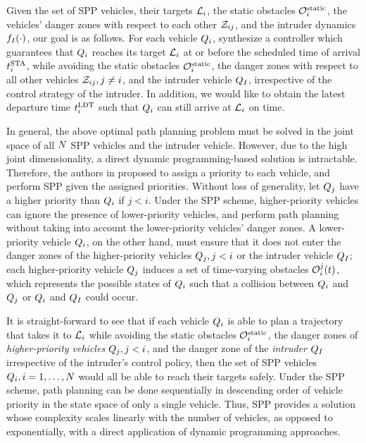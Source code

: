 Given the set of SPP vehicles, their targets $\mathcal{L}_i$, the static obstacles $\mathcal{O}^\text{static}_i$, the vehicles' danger zones with respect to each other $\mathcal{Z}_{ij}$, and the intruder dynamics $f_I(\cdot)$, our goal is as follows. For each vehicle $Q_i$, synthesize a controller which guarantees that $Q_i$ reaches its target $\mathcal{L}_i$ at or before the scheduled time of arrival $t^\text{STA}_i$, while avoiding the static obstacles $\mathcal{O}^\text{static}_i$, the danger zones with respect to all other vehicles $\mathcal{Z}_{ij}, j\neq i$, and the intruder vehicle $Q_{I}$, irrespective of the control strategy of the intruder. In addition, we would like to obtain the latest departure time $t^\text{LDT}_i$ such that $Q_i$ can still arrive at $\mathcal{L}_i$ on time.

In general, the above optimal path planning problem must be solved in the joint space of all $N$ SPP vehicles and the intruder vehicle. However, due to the high joint dimensionality, a direct dynamic programming-based solution is intractable. Therefore, the authors in \cite{Chen15c} proposed to assign a priority to each vehicle, and perform SPP given the assigned priorities. Without loss of generality, let $Q_j$ have a higher priority than $Q_i$ if $j<i$. Under the SPP scheme, higher-priority vehicles can ignore the presence of lower-priority vehicles, and perform path planning without taking into account the lower-priority vehicles' danger zones. A lower-priority vehicle $Q_i$, on the other hand, must ensure that it does not enter the danger zones of the higher-priority vehicles $Q_j, j<i$ or the intruder vehicle $Q_{I}$; each higher-priority vehicle $Q_j$ induces a set of time-varying obstacles $\mathcal{O}_i^j(t)$, which represents the possible states of $Q_i$ such that a collision between $Q_i$ and $Q_j$ or $Q_i$ and $Q_{I}$ could occur.

It is straight-forward to see that if each vehicle $Q_i$ is able to plan a trajectory that takes it to $\mathcal{L}_i$ while avoiding the static obstacles $\mathcal{O}^\text{static}_i$, the danger zones of \textit{higher-priority vehicles} $Q_j, j<i$, and the danger zone of the \textit{intruder} $Q_{I}$ irrespective of the intruder's control policy, then the set of SPP vehicles $Q_i, i=1,\ldots,N$ would all be able to reach their targets safely. Under the SPP scheme, path planning can be done sequentially in descending order of vehicle priority in the state space of only a single vehicle. Thus, SPP provides a solution whose complexity scales linearly with the number of vehicles, as opposed to exponentially, with a direct application of dynamic programming approaches. 


